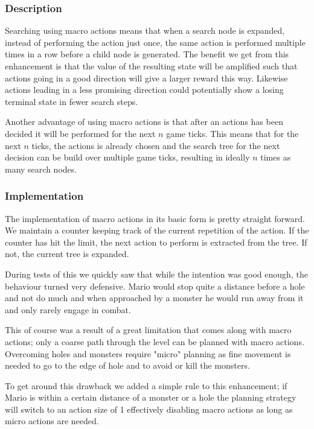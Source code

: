 \documentclass[10pt,a4paper]{article}
\begin{document}
\subsubsection*{Description}
Searching using macro actions means that when a search node is expanded, instead of performing the action just once, the same action is performed multiple times in a row before a child node is generated.
The benefit we get from this enhancement is that the value of the resulting state will be amplified such that actions going in a good direction will give a larger reward this way. Likewise actions leading in a less promising direction could potentially show a losing terminal state in fewer search steps.

Another advantage of using macro actions is that after an actions has been decided it will be performed for the next $n$ game ticks. This means that for the next $n$ ticks, the actions is already chosen and the search tree for the next decision can be build over multiple game ticks, resulting in ideally $n$ times as many search nodes.

\subsubsection*{Implementation} %
The implementation of macro actions in its basic form is pretty straight forward. We maintain a counter keeping track of the current repetition of the action. If the counter has hit the limit, the next action to perform is extracted from the tree. If not, the current tree is expanded.

During tests of this we quickly saw that while the intention was good enough, the behaviour turned very defensive. Mario would stop quite a distance before a hole and not do much and when approached by a monster he would run away from it and only rarely engage in combat.

This of course was a result of a great limitation that comes along with macro actions; only a coarse path through the level can be planned with macro actions. Overcoming holes and monsters require "micro" planning as fine movement is needed to go to the edge of hole and to avoid or kill the monsters.

To get around this drawback we added a simple rule to this enhancement; if Mario is within a certain distance of a monster or a hole the planning strategy will switch to an action size of 1 effectively disabling macro actions as long as micro actions are needed.
\end{document}
